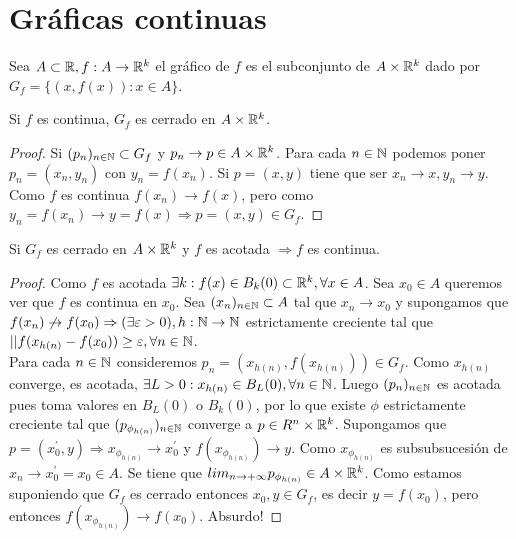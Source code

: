 \section{Gráficas continuas}

\begin{definition}
  Sea $A \subset \mathbb{R}, f: A \to \mathbb{R}^k$ el gráfico de $f$ es el subconjunto de $A \times \mathbb{R}^k$ dado por $G_f = \{ (x, f(x)) : x \in A \}$.
\end{definition}

\begin{prop}
  Si $f$ es continua, $G_f$ es cerrado en $A \times \mathbb{R}^k$. 
  \begin{proof}
    Si $(p_n)_{n \in \mathbb{N}} \subset G_f$ y $p_n \to p \in A \times \mathbb{R}^k$. Para cada $n \in \mathbb{N}$ podemos poner $p_n = (x_n, y_n)$ con $y_n = f(x_n)$. Si $p = (x, y)$ tiene que ser $x_n \to x, y_n \to y$. Como $f$ es continua $f(x_n) \to f(x)$, pero como $y_n = f(x_n) \to y = f(x) \Rightarrow p = (x, y) \in G_f$. 
  \end{proof}
\end{prop}

\begin{prop}
  Si $G_f$ es cerrado en $A \times \mathbb{R}^k$ y $f$ es acotada $\Rightarrow f$ es continua.
  \begin{proof}
    Como $f$ es acotada $\exists k : f(x) \in B_k(0) \subset \mathbb{R}^k, \forall x \in A$. Sea $x_0 \in A$ queremos ver que $f$ es continua en $x_0$. Sea $(x_n)_{n \in \mathbb{N}} \subset A$ tal que $x_n \to x_0$ y supongamos que $f(x_n) \not \to f(x_0) \Rightarrow (\exists \varepsilon > 0), h: \mathbb{N} \to \mathbb{N}$ estrictamente creciente tal que $||f(x_{h(n)} - f(x_0)) \geq \varepsilon, \forall n \in \mathbb{N}$. \\
    Para cada $n \in \mathbb{N}$ consideremos $p_n = (x_{h(n)}, f(x_{h(n)})) \in G_f$. Como $x_{h(n)}$ converge, es acotada, $\exists L > 0 : x_{h(n)} \in B_L(0), \forall n \in \mathbb{N}$. Luego $(p_n)_{n \in \mathbb{N}}$ es acotada pues toma valores en $B_L(0)$ o $B_k(0)$, por lo que existe $\phi$ estrictamente creciente tal que $(p_{\phi_{h(n)}})_{n \in \mathbb{N}}$ converge a $p \in R^n \times \mathbb{R}^k$.
    Supongamos que $p = (x_0^{\prime}, y) \Rightarrow x_{\phi_{h(n)}} \to x_0^{\prime}$ y $f(x_{\phi_{h(n)}}) \to y$. Como $x_{\phi_{h(n)}}$ es subsubsucesión de $x_n \to x_0^{\prime} = x_0 \in A$. Se tiene que $lim_{n \to +\infty} p_{\phi_{h(n)}} \in A \times \mathbb{R}^k$. Como estamos suponiendo que $G_f$ es cerrado entonces $x_0, y \in G_f$, es decir $y = f(x_0)$, pero entonces $f(x_{\phi_{h(n)}}) \to f(x_0)$. Absurdo!
  \end{proof}
\end{prop}


